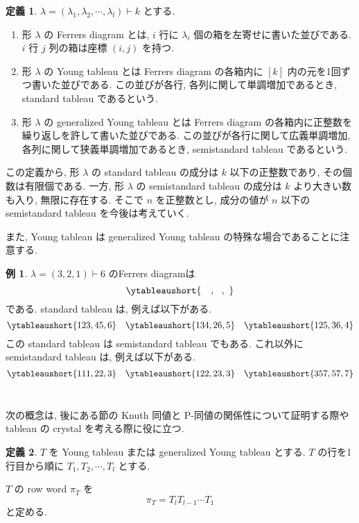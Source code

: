 \documentclass[
  a4paper, 
  12pt,
  ja=standard,
  xelatex,
  left=30truemm,
  right=30truemm,
  titlepage 
]{bxjsarticle}
\theoremstyle{definition}
\newtheorem{df}{定義}[section]
\newtheorem*{ex}{例}
\begin{document}
\begin{df} $\lambda = (\lambda_1, \lambda_2, \cdots, \lambda_l) \vdash k$ とする.
  \begin{enumerate} 
    \item 形 $\lambda$ の Ferrers diagram とは, $i$ 行に $\lambda_i$ 個の箱を左寄せに書いた並びである. 
    $i$ 行 $j$ 列の箱は座標 $(i, j)$ を持つ.
    \item 形 $\lambda$ の Young tableau とは Ferrers diagram の各箱内に $[k]$ 内の元を1回ずつ書いた並びである. 
    この並びが各行, 各列に関して単調増加であるとき, standard tableau であるという.
    \item 形 $\lambda$ の generalized Young tableau とは Ferrers diagram の各箱内に正整数を繰り返しを許して書いた並びである. 
    この並びが各行に関して広義単調増加, 各列に関して狭義単調増加であるとき, semistandard tableau であるという.
  \end{enumerate} 
\end{df}

この定義から, 形 $\lambda$ の standard tableau の成分は $k$ 以下の正整数であり,
その個数は有限個である.
一方, 形 $\lambda$ の semistandard tableau の成分は $k$ より大きい数も入り,
無限に存在する.
そこで $n$ を正整数とし, 成分の値が $n$ 以下の semistandard tableau を今後は考えていく.

また, Young tableau は generalized Young tableau の特殊な場合であることに注意する.

\begin{ex}
  $\lambda=(3, 2, 1) \vdash 6$ のFerrers diagramは
  \[
    \ytableaushort{~~~,~~,~}
  \]
  である. 
  standard tableau は, 例えば以下がある.
  \[
    \ytableaushort{123,45,6} \quad
    \ytableaushort{134,26,5} \quad
    \ytableaushort{125,36,4}
  \]
  この standard tableau は semistandard tableau でもある.
  これ以外に semistandard tableau は, 例えば以下がある.
  \[
    \ytableaushort{111,22,3} \quad
    \ytableaushort{122,23,3} \quad
    \ytableaushort{357,57,7}
  \]
  \\[10pt]
\end{ex}

次の概念は, 後にある節の Knuth 同値と P-同値の関係性について証明する際や
tableau の crystal を考える際に役に立つ.

\begin{df}
  $T$ を Young tableau または generalized Young tableau とする.
  $T$ の行を1行目から順に $T_1, T_2, \cdots, T_l$ とする.

  $T$ の row word $\pi_T$ を
  $$ \pi_T = T_l T_{l-1} \cdots T_1 $$
  と定める.
\end{df}
\end{document}
